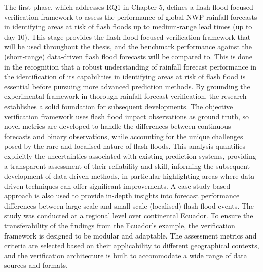 The first phase, which addresses RQ1 in Chapter 5, defines a flash-flood-focused verification framework to assess the performance of global NWP rainfall forecasts in identifying areas at risk of flash floods up to medium-range lead times (up to day 10). This stage provides the flash-flood-focused verification framework that will be used throughout the thesis, and the benchmark performance against the (short-range) data-driven flash flood forecasts will be compared to. This is done in the recognition that a robust understanding of rainfall forecast performance in the identification of its capabilities in identifying areas at risk of flash flood is essential before pursuing more advanced prediction methods. By grounding the experimental framework in thorough rainfall forecast verification, the research establishes a solid foundation for subsequent developments. The objective verification framework uses flash flood impact observations as ground truth, so novel metrics are developed to handle the differences between continuous forecasts and binary observations, while accounting for the unique challenges posed by the rare and localised nature of flash floods. This analysis quantifies explicitly the uncertainties associated with existing prediction systems, providing a transparent assessment of their reliability and skill, informing the subsequent development of data-driven methods, in particular highlighting areas where data-driven techniques can offer significant improvements. A case-study-based approach is also used to provide in-depth insights into forecast performance differences between large-scale and small-scale (localised) flash flood events. The study was conducted at a regional level over continental Ecuador. To ensure the transferability of the findings from the Ecuador's example, the verification framework is designed to be modular and adaptable. The assessment metrics and criteria are selected based on their applicability to different geographical contexts, and the verification architecture is built to accommodate a wide range of data sources and formats. 

